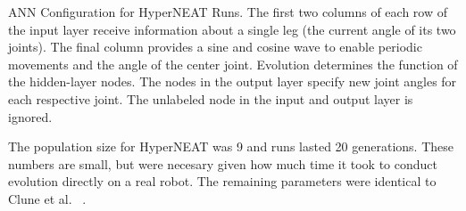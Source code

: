 \begin{itemize}


ANN Configuration for HyperNEAT Runs. The first two columns of each row of the input layer receive information about a single leg (the current angle of its two joints). The final column provides a sine and cosine wave to enable periodic movements and the angle of the center joint. Evolution determines the function of the hidden-layer nodes. The nodes in the output layer specify new joint angles for each respective joint. The unlabeled node in the input and output layer is ignored.  




The population size for HyperNEAT was 9 and runs lasted 20 generations. These numbers are small, but were necesary given how much time it took to conduct evolution directly on a real robot. The remaining parameters were identical to Clune et al. ~\cite{clune2011performance}.	

  



\end{itemize}

